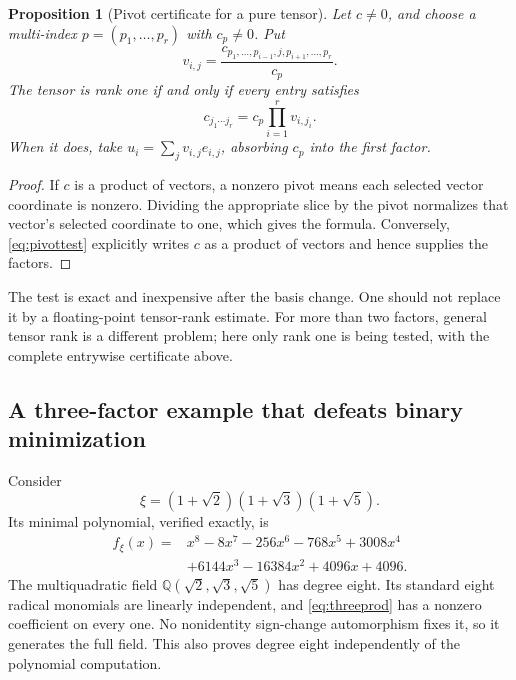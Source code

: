\documentclass[11pt,letterpaper]{article}
\newtheorem{proposition}[theorem]{Proposition}
\theoremstyle{definition}
\theoremstyle{remark}
\newcommand{\Q}{\mathbb Q}
\begin{document}
\begin{proposition}[Pivot certificate for a pure tensor]\label{prop:tensor}
Let \(c\ne0\), and choose a multi-index \(p=(p_1,\ldots,p_r)\) with
\(c_p\ne0\). Put
\[
 v_{i,j}=\frac{c_{p_1,\ldots,p_{i-1},j,p_{i+1},\ldots,p_r}}{c_p}.
\]
The tensor is rank one if and only if every entry satisfies
\begin{equation}
 c_{j_1\cdots j_r}=c_p\prod_{i=1}^r v_{i,j_i}.\label{eq:pivottest}
\end{equation}
When it does, take \(u_i=\sum_jv_{i,j}e_{i,j}\), absorbing \(c_p\)
into the first factor.
\end{proposition}
\begin{proof}
If \(c\) is a product of vectors, a nonzero pivot means each selected
vector coordinate is nonzero. Dividing the appropriate slice by the pivot
normalizes that vector's selected coordinate to one, which gives the formula.
Conversely, \eqref{eq:pivottest} explicitly writes \(c\) as a product of
vectors and hence supplies the factors.
\end{proof}
The test is exact and inexpensive after the basis change. One should not
replace it by a floating-point tensor-rank estimate. For more than two
factors, general tensor rank is a different problem; here only rank one is
being tested, with the complete entrywise certificate above.

\subsection{A three-factor example that defeats binary minimization}
Consider
\begin{equation}
 \xi=(1+\sqrt2)(1+\sqrt3)(1+\sqrt5).\label{eq:threeprod}
\end{equation}
Its minimal polynomial, verified exactly, is
\begin{equation}
\begin{split}
 f_\xi(x)={}&x^8-8x^7-256x^6-768x^5+3008x^4\\
            &+6144x^3-16384x^2+4096x+4096.
\end{split}\label{eq:f8}
\end{equation}
The multiquadratic field \(\Q(\sqrt2,\sqrt3,\sqrt5)\) has degree eight.
Its standard eight radical monomials are linearly independent, and
\eqref{eq:threeprod} has a nonzero coefficient on every one. No nonidentity
sign-change automorphism fixes it, so it generates the full field. This also
proves degree eight independently of the polynomial computation.
\end{document}
